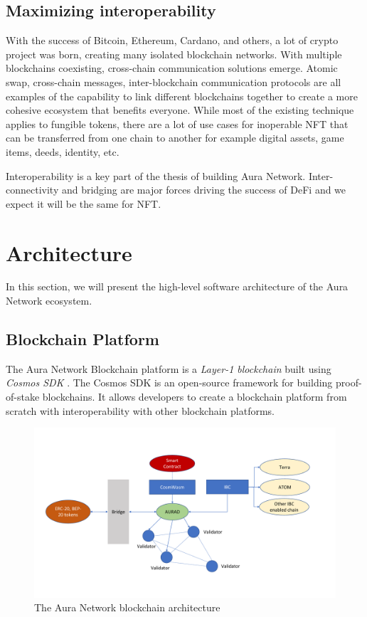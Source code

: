 \documentclass[11pt, titlepage]{article}
\begin{document}
\subsection{Maximizing interoperability}

With the success of Bitcoin, Ethereum, Cardano, and others, a lot of crypto project was born, creating many isolated blockchain networks. With multiple blockchains coexisting, cross-chain communication solutions emerge. Atomic swap, cross-chain messages, inter-blockchain communication protocols are all examples of the capability to link different blockchains together to create a more cohesive ecosystem that benefits everyone. While most of the existing technique applies to fungible tokens, there are a lot of use cases for inoperable NFT that can be transferred from one chain to another for example digital assets, game items, deeds, identity, etc.

Interoperability is a key part of the thesis of building Aura Network. Inter-connectivity and bridging are major forces driving the success of DeFi and we expect it will be the same for NFT.

\section{Architecture}
In this section, we will present the high-level software architecture of the Aura Network ecosystem. 

\subsection{Blockchain Platform}
The Aura Network Blockchain platform is a \emph{Layer-1 blockchain} built using \emph{Cosmos SDK} \cite{kwon2019cosmos}. The Cosmos SDK is an open-source framework for building proof-of-stake blockchains. It allows developers to create a blockchain platform from scratch with interoperability with other blockchain platforms. 

\begin{figure}[ht]
\includegraphics[width=\textwidth, trim={0 2cm 2cm 0}, clip]{img/architecture.pdf}
\centering
\caption{The Aura Network blockchain architecture}
\label{fig:architecture}
\end{figure}
\end{document}
